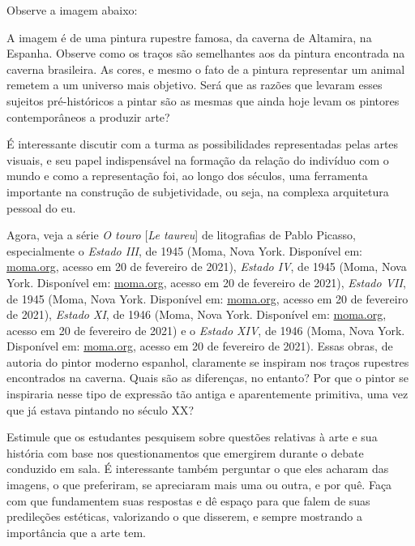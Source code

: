 \documentclass[12pt]{extarticle}
\begin{document}
Observe a imagem abaixo:


  A imagem é de uma pintura rupestre famosa, da caverna de Altamira, na
  Espanha. Observe como os traços são semelhantes aos da pintura
  encontrada na caverna brasileira. As cores, e mesmo o fato de a
  pintura representar um animal remetem a um universo mais objetivo.
  Será que as razões que levaram esses sujeitos pré-históricos a pintar
  são as mesmas que ainda hoje levam os pintores contemporâneos a
  produzir arte?

  É interessante discutir com a turma as possibilidades representadas
  pelas artes visuais, e seu papel indispensável na formação da relação
  do indivíduo com o mundo e como a representação foi, ao longo dos
  séculos, uma ferramenta importante na construção de subjetividade, ou
  seja, na complexa arquitetura pessoal do eu.

Agora, veja a série \emph{O touro} {[}\emph{Le taureu}{]} de
  litografias de Pablo Picasso, especialmente o \emph{Estado III}, de
  1945 (Moma, Nova York. Disponível em:
  \href{https://www.moma.org/collection/works/62951}{moma.org},
  acesso em 20 de fevereiro de 2021), \emph{Estado IV}, de 1945 (Moma,
  Nova York. Disponível em:
  \href{https://www.moma.org/collection/works/62968}{moma.org},
  acesso em 20 de fevereiro de 2021), \emph{Estado VII}, de 1945 (Moma,
  Nova York. Disponível em:
  \href{https://www.moma.org/collection/works/62986}{moma.org},
  acesso em 20 de fevereiro de 2021), \emph{Estado XI}, de 1946 (Moma,
  Nova York. Disponível em:
  \href{https://www.moma.org/collection/works/63046}{moma.org},
  acesso em 20 de fevereiro de 2021) e o \emph{Estado XIV}, de 1946
  (Moma, Nova York. Disponível em:
  \href{https://www.moma.org/collection/works/65356}{moma.org},
  acesso em 20 de fevereiro de 2021). Essas obras, de autoria do pintor
  moderno espanhol, claramente se inspiram nos traços rupestres
  encontrados na caverna. Quais são as diferenças, no entanto? Por que o
  pintor se inspiraria nesse tipo de expressão tão antiga e
  aparentemente primitiva, uma vez que já estava pintando no século XX?

  Estimule que os estudantes pesquisem sobre questões relativas à arte e
  sua história com base nos questionamentos que emergirem durante o
  debate conduzido em sala. É interessante também perguntar o que eles
  acharam das imagens, o que preferiram, se apreciaram mais uma ou
  outra, e por quê. Faça com que fundamentem suas respostas e dê espaço
  para que falem de suas predileções estéticas, valorizando o que
  disserem, e sempre mostrando a importância que a arte tem.
\end{document}
